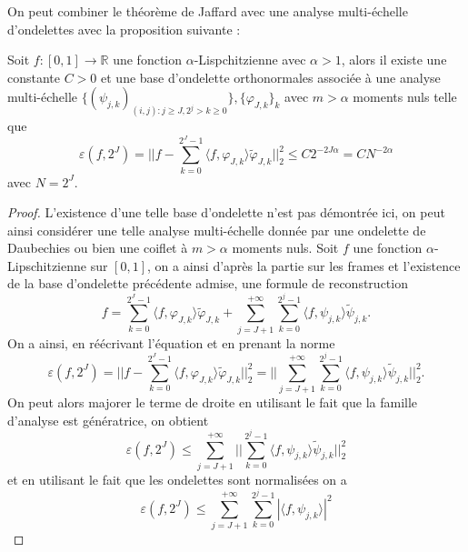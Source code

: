 On peut combiner le théorème de Jaffard avec une analyse multi-échelle d'ondelettes avec la proposition suivante :
\begin{proposition}
	Soit $f:[0,1] \to \mathbb{R}$ une fonction $\alpha$-Lispchitzienne avec $\alpha>1$, alors il existe une constante $C>0$ et une base d'ondelette orthonormales associée à une analyse multi-échelle $\{(\psi_{j,k})_{(i,j): j\geq J, 2^{j} > k\geq 0}\}, \{\varphi_{J,k}\}_k$ avec $m>\alpha$ moments nuls telle que  
	\begin{equation}
		\varepsilon(f, 2^J) = ||f - \sum_{k=0}^{2^J -1} \langle f, \varphi_{J,k}\rangle \tilde{\varphi}_{J,k}||_2^2 \leq C 2^{-2J\alpha} = CN^{-2\alpha}
	\end{equation}
	avec $N=2^J$.
\end{proposition}
\begin{proof}
	L'existence d'une telle base d'ondelette n'est pas démontrée ici, on peut ainsi considérer une telle analyse multi-échelle donnée par une ondelette de Daubechies ou bien une coiflet à $m>\alpha$ moments nuls.
	Soit $f$ une fonction $\alpha$-Lipschitzienne sur $[0,1]$, on a ainsi d'après la partie sur les frames et l'existence de la base d'ondelette précédente admise, une formule de reconstruction
	\begin{equation*}
		f = \sum_{k=0}^{2^J -1} \langle f, \varphi_{J,k}\rangle \tilde{\varphi}_{J,k} + \sum_{j=J+1}^{+\infty}\sum_{k=0}^{2^j-1} \langle f, \psi_{j,k} \rangle \tilde{\psi}_{j,k}. 
	\end{equation*}
	On a ainsi, en réécrivant l'équation et en prenant la norme
	\begin{equation*}
		\varepsilon(f, 2^J) = ||f - \sum_{k=0}^{2^J -1} \langle f, \varphi_{J,k}\rangle \tilde{\varphi}_{J,k}||_2^2 =|| \sum_{j=J+1}^{+\infty}\sum_{k=0}^{2^j-1} \langle f, \psi_{j,k} \rangle \tilde{\psi}_{j,k}||_2^2. 
	\end{equation*}
	On peut alors majorer le terme de droite en utilisant le fait que la famille d'analyse est génératrice, on obtient
	\begin{equation*}
		\varepsilon(f, 2^J) \leq \sum_{j=J+1}^{+\infty} ||\sum_{k=0}^{2^j -1} \langle f, \psi_{j,k} \rangle \tilde{\psi}_{j,k} ||_2^2
	\end{equation*}
	et en utilisant le fait que les ondelettes sont normalisées on a
	\begin{equation*}
		\varepsilon(f, 2^J) \leq \sum_{j=J+1}^{+\infty} \sum_{k=0}^{2^j -1} |\langle f, \psi_{j,k} \rangle|^2
	\end{equation*}

\end{proof}
